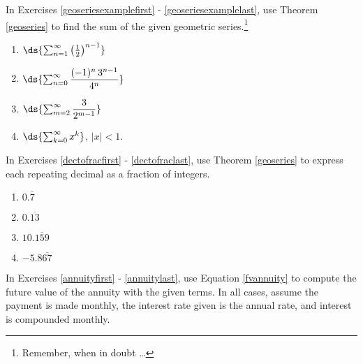 \documentclass{ximera}
\begin{document}
In Exercises \ref{geoseriesexamplefirst} - \ref{geoseriesexamplelast}, use Theorem \ref{geoseries} to find the sum of the given geometric series.\footnote{Remember, when in doubt \ldots}

\begin{multicols}{4}
\begin{enumerate}
\setcounter{enumi}{\value{HW}}
\item $\ds{ \sum_{n = 1}^{\infty} \left( \frac{1}{2} \right)^{n-1}}$  \label{geoseriesexamplefirst}
\item $\ds{ \sum_{n = 0}^{\infty}  \dfrac{(-1)^n \, 3^{n-1}}{4^{n}}}$ 
\item $\ds{ \sum_{m = 2}^{\infty}   \dfrac{3}{2^{m-1}}}$ 
\item $\ds{ \sum_{k =0}^{\infty}  x^{k}}$, $|x|<1$.  \label{geoseriesexamplelast}
\setcounter{HW}{\value{enumi}}
\end{enumerate}

\end{multicols}

\pagebreak

In Exercises \ref{dectofracfirst} - \ref{dectofraclast}, use Theorem \ref{geoseries} to express each repeating decimal as a fraction of integers.

\begin{multicols}{4}

\begin{enumerate}
\setcounter{enumi}{\value{HW}}
\item $0.\overline{7}$ \label{dectofracfirst}
\item $0.\overline{13}$
\item $10.\overline{159}$
\item $-5.8\overline{67}$ \label{dectofraclast}
\setcounter{HW}{\value{enumi}}
\end{enumerate}

\end{multicols}


In Exercises \ref{annuityfirst} - \ref{annuitylast}, use Equation \ref{fvannuity} to compute the future value of the annuity with the given terms.  In all cases, assume the payment is made monthly, the interest rate given is the annual rate, and interest is compounded monthly.
\end{document}
